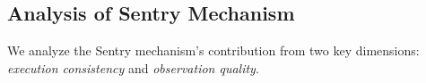 



\subsection{Analysis of Sentry Mechanism}
\label{sec:sentry}
We analyze the Sentry mechanism's contribution from two key dimensions: \textit{execution consistency} and \textit{observation quality}.

